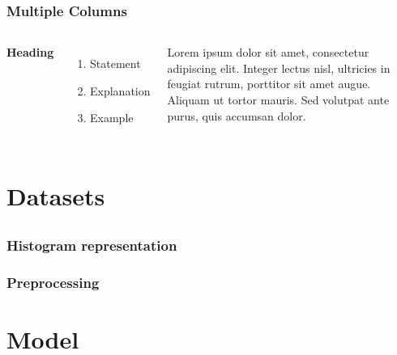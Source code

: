 \documentclass{beamer}
\begin{document}

\begin{frame}
\frametitle{Multiple Columns}
\begin{columns}[c] %

\textbf{Heading}
\begin{enumerate}
\item Statement
\item Explanation
\item Example
\end{enumerate}

Lorem ipsum dolor sit amet, consectetur adipiscing elit. Integer lectus nisl, ultricies in feugiat rutrum, porttitor sit amet augue. Aliquam ut tortor mauris. Sed volutpat ante purus, quis accumsan dolor.

\end{columns}
\end{frame}


\section{Datasets} %
\subsection{}

\begin{frame}
\frametitle{Histogram representation}

\end{frame}

\begin{frame}
\frametitle{Preprocessing}

\end{frame}

\section{Model} %
\end{document}
